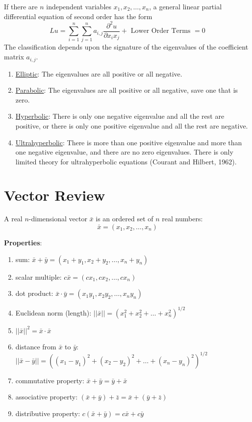 \documentclass[12pt]{article}
\begin{document}
If there are $n$ independent variables $x_1, x_2 , \dots, x_n$, a general linear partial differential equation of second order has the form
%
\begin{equation}
Lu = \sum_{i=1}^n \sum_{j=1}^n a_{i,j} \frac{\partial^2 u}{\partial x_i x_j} + \text{ Lower Order Terms } = 0 \nonumber
\end{equation}
%
The classification depends upon the signature of the eigenvalues of the coefficient matrix $a_{i,j}$.
\begin{enumerate}
\item \underline{Elliptic}: The eigenvalues are all positive or all negative.
\item \underline{Parabolic}: The eigenvalues are all positive or all negative, save one that is zero.
\item \underline{Hyperbolic}: There is only one negative eigenvalue and all the rest are positive, or there is only one positive eigenvalue and all the rest are negative.
\item \underline{Ultrahyperbolic}: There is more than one positive eigenvalue and more than one negative eigenvalue, and there are no zero eigenvalues. There is only limited theory for ultrahyperbolic equations (Courant and Hilbert, 1962).
\end{enumerate}

\section{Vector Review}

A real $n$-dimensional vector $\bar{x}$ is an ordered set of $n$ real numbers:
%
\begin{equation}
\bar{x} = (x_1, x_2, \dots, x_n) \nonumber
\end{equation}

\textbf{Properties}:
%
\begin{enumerate}
\item sum: $\bar{x} + \bar{y} = (x_1 + y_1, x_2 + y_2, \dots, x_n + y_n)$
\item scalar multiple: $c\bar{x} = (cx_1, cx_2, \dots, cx_n)$
\item dot product: $\bar{x} \cdot \bar{y} = (x_1 y_1, x_2 y_2, \dots, x_n y_n)$
\item Euclidean norm (length): $||\bar{x}|| = (x_1^2 + x_2^2 + \dots + x_n^2)^{1/2}$
\item $||\bar{x}||^2 = \bar{x} \cdot \bar{x}$
\item distance from $\bar{x}$ to $\bar{y}$: $||\bar{x} - \bar{y}|| = ((x_1 - y_1)^2 + (x_2 - y_2)^2 + \dots + (x_n - y_n)^2)^{1/2}$
\item commutative property: $\bar{x} + \bar{y} = \bar{y} + \bar{x}$
\item associative property: $(\bar{x} + \bar{y}) + \bar{z} = \bar{x} + (\bar{y} + \bar{z})$
\item distributive property: $c(\bar{x} + \bar{y}) = c\bar{x} + c\bar{y}$
\end{enumerate}
\end{document}
